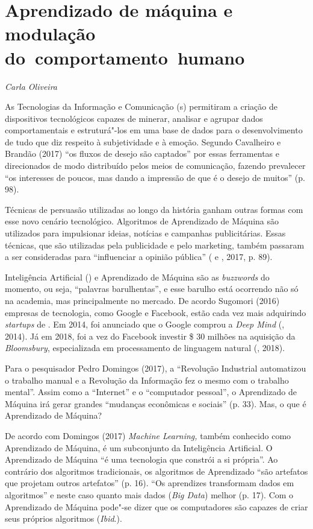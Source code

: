 \chapter{Aprendizado de máquina e modulação do~comportamento~humano}

\begin{flushright}
\emph{Carla Oliveira}
\end{flushright}

As Tecnologias da Informação e Comunicação (s) permitiram a criação
de dispositivos tecnológicos capazes de minerar, analisar e agrupar
dados comportamentais e estruturá"-los em uma base de dados para o
desenvolvimento de tudo que diz respeito à subjetividade e à emoção.
Segundo Cavalheiro e Brandão (2017) ``os fluxos de desejo são captados''
por essas ferramentas e direcionados de modo distribuído pelos meios de
comunicação, fazendo prevalecer ``os interesses de poucos, mas dando a
impressão de que é o desejo de muitos'' (p. 98).

Técnicas de persuasão utilizadas ao longo da história ganham outras
formas com esse novo cenário tecnológico. Algoritmos de Aprendizado de
Máquina são utilizados para impulsionar ideias, notícias e campanhas
publicitárias. Essas técnicas, que são utilizadas pela publicidade e
pelo marketing, também passaram a ser consideradas para ``influenciar a
opinião pública'' ( e , 2017, p. 89).

Inteligência Artificial () e Aprendizado de Máquina são as
\emph{buzzwords} do momento, ou seja, ``palavras barulhentas'', e esse
barulho está ocorrendo não só na academia, mas principalmente no
mercado. De acordo Sugomori (2016) empresas de tecnologia, como Google e
Facebook, estão cada vez mais adquirindo \emph{startups} de . Em 2014,
foi anunciado que o Google comprou a \emph{Deep Mind} (, 2014). Já
em 2018, foi a vez do Facebook investir \$ 30 milhões na aquisição da
\emph{Bloomsbury}, especializada em processamento de linguagem natural
(, 2018).

Para o pesquisador Pedro Domingos (2017), a ``Revolução Industrial
automatizou o trabalho manual e a Revolução da Informação fez o mesmo
com o trabalho mental''. Assim como a ``Internet'' e o ``computador
pessoal'', o Aprendizado de Máquina irá gerar grandes ``mudanças
econômicas e sociais'' (p. 33). Mas, o que é Aprendizado de Máquina?

De acordo com Domingos (2017) \emph{Machine Learning,} também conhecido
como Aprendizado de Máquina, é um subconjunto da Inteligência
Artificial. O Aprendizado de Máquina ``é uma tecnologia que constrói a
si própria''. Ao contrário dos algoritmos tradicionais, os algoritmos de
Aprendizado ``são artefatos que projetam outros artefatos'' (p. 16).
``Os aprendizes transformam dados em algoritmos'' e neste caso quanto
mais dados (\emph{Big Data}) melhor (p. 17). Com o Aprendizado de
Máquina pode"-se dizer que os computadores são capazes de criar seus
próprios algoritmos (\emph{Ibid}.).

